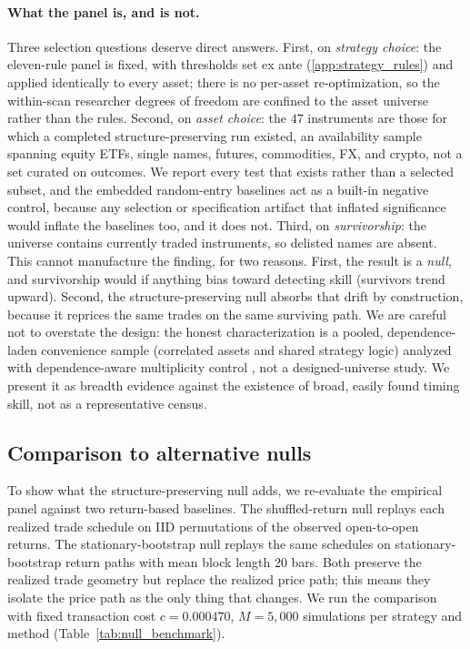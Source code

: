 \documentclass[preprint,12pt]{elsarticle}
\theoremstyle{definition}
\begin{document}
\paragraph{What the panel is, and is not.} Three selection questions deserve direct answers. First, on \emph{strategy choice}: the eleven-rule panel is fixed, with thresholds set ex ante (\ref{app:strategy_rules}) and applied identically to every asset; there is no per-asset re-optimization, so the within-scan researcher degrees of freedom are confined to the asset universe rather than the rules. Second, on \emph{asset choice}: the $47$ instruments are those for which a completed structure-preserving run existed, an availability sample spanning equity ETFs, single names, futures, commodities, FX, and crypto, not a set curated on outcomes. We report every test that exists rather than a selected subset, and the embedded random-entry baselines act as a built-in negative control, because any selection or specification artifact that inflated significance would inflate the baselines too, and it does not. Third, on \emph{survivorship}: the universe contains currently traded instruments, so delisted names are absent. This cannot manufacture the finding, for two reasons. First, the result is a \emph{null}, and survivorship would if anything bias toward detecting skill (survivors trend upward). Second, the structure-preserving null absorbs that drift by construction, because it reprices the same trades on the same surviving path. We are careful not to overstate the design: the honest characterization is a pooled, dependence-laden convenience sample (correlated assets and shared strategy logic) analyzed with dependence-aware multiplicity control \cite{benjaminihochberg1995,BenjaminiYekutieli2001}, not a designed-universe study. We present it as breadth evidence against the existence of broad, easily found timing skill, not as a representative census.

\subsection{Comparison to alternative nulls}

To show what the structure-preserving null adds, we re-evaluate the empirical panel against two return-based baselines. The shuffled-return null replays each realized trade schedule on IID permutations of the observed open-to-open returns. The stationary-bootstrap null replays the same schedules on stationary-bootstrap return paths with mean block length 20 bars. Both preserve the realized trade geometry but replace the realized price path; this means they isolate the price path as the only thing that changes. We run the comparison with fixed transaction cost $c=0.000470$, $M=5{,}000$ simulations per strategy and method (Table~\ref{tab:null_benchmark}).
\end{document}
